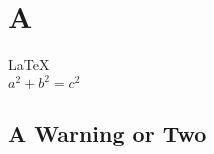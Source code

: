 \documentclass{article}
\begin{document}
               
 
\section{A }          
\LaTeX \,\\ 
 $a^2+b^2=c^2$

\subsection{A Warning or Two}  

\end{document}

